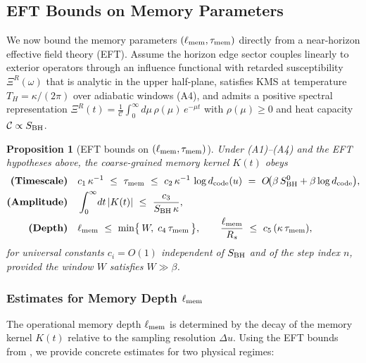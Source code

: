 \documentclass[aps,prd,preprint,onecolumn,superscriptaddress,nofootinbib,longbibliography,floatfix,11pt,showpacs,showkeys]{revtex4-2}
\theoremstyle{plain}
\newtheorem{proposition}[theorem]{Proposition}
\theoremstyle{definition}
\theoremstyle{remark}
\begin{document}
\subsection{EFT Bounds on Memory Parameters}
\label{sec:eft-bounds}
We now bound the memory parameters $(\ell_{\rm mem},\tau_{\rm mem})$ directly from a near-horizon effective field theory (EFT).
Assume the horizon edge sector couples linearly to exterior operators through an influence functional with retarded susceptibility
$\Xi^R(\omega)$ that is analytic in the upper half-plane, satisfies KMS at temperature $T_H=\kappa/(2\pi)$ over adiabatic windows
(A4), and admits a positive spectral representation $\Xi^R(t)=\frac{1}{\mathcal{C}}\int_0^\infty\!d\mu\,\rho(\mu)\,e^{-\mu t}$ with
$\rho(\mu)\ge 0$ and heat capacity $\mathcal{C}\propto S_{\rm BH}$.

\begin{proposition}[EFT bounds on $(\ell_{\rm mem},\tau_{\rm mem})$]\label{prop:eft-bounds}
Under (A1)--(A4) and the EFT hypotheses above, the coarse-grained memory kernel $K(t)$ obeys
\begin{align}
\textbf{(Timescale)}\quad & c_1\,\kappa^{-1} \ \le\ \tau_{\rm mem}
\ \le\ c_2\,\kappa^{-1}\,\log d_{\rm code}(u)\ =\ O\!\big(\beta\,S_{\rm BH}^0 + \beta\log d_{\rm code}\big), \label{eq:tau-bounds}\\
\textbf{(Amplitude)}\quad & \int_0^\infty\!dt\,|K(t)|\ \le\ \frac{c_3}{S_{\rm BH}\,\kappa}, \label{eq:amp-bound}\\
\textbf{(Depth)}\quad & \ell_{\rm mem}\ \le\ \min\!\big\{\,W,\; c_4\,\tau_{\rm mem}\,\big\},\qquad
\frac{\ell_{\rm mem}}{R_s}\ \le\ c_5\,(\kappa\,\tau_{\rm mem}), \label{eq:depth-bound}
\end{align}
for universal constants $c_i=O(1)$ independent of $S_{\rm BH}$ and of the step index $n$, provided the window $W$ satisfies $W\gg\beta$.
\end{proposition}

\subsubsection{Estimates for Memory Depth \texorpdfstring{$\ell_{\rm mem}$}{l\_mem}}
\label{sec:memory-depth-estimates}

The operational memory depth $\ell_{\rm mem}$ is determined by the decay of the memory kernel $K(t)$ relative to the sampling resolution $\Delta u$.
Using the EFT bounds from , we provide concrete estimates for two physical regimes:
\end{document}
